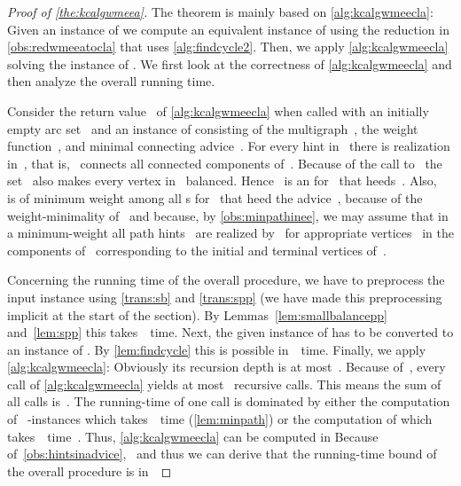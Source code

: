 \begin{proof}[Proof of \autoref{the:kcalgwmeea}]
  The theorem is mainly based on \autoref{alg:kcalgwmeecla}: Given an instance of \pWMEECAs{} we compute an equivalent instance of \pWMEECCLAs{} using the reduction in \autoref{obs:redwmeeatocla} that uses \autoref{alg:findcycle2}. Then, we apply \autoref{alg:kcalgwmeecla} solving the instance of \pWMEECLAs{}. We first look at the correctness of \autoref{alg:kcalgwmeecla} and then analyze the overall running time.

  Consider the return value~ of \autoref{alg:kcalgwmeecla} when called with an initially empty arc set~ and an instance of \pWMEECLAs{} consisting of the multigraph~, the weight function~, and minimal connecting advice~. For every hint in~ there is realization in~, that is,~ connects all connected components of~. Because of the call to~ the set~ also makes every vertex in~ balanced. Hence~ is an \EE{} for~ that heeds~. Also,~ is of minimum weight among all \EE s for~ that heed the advice~, because of the weight-minimality of~ and because, by \autoref{obs:minpathinee}, we may assume that in a minimum-weight \EE{} all path hints~ are realized by~ for appropriate vertices~ in the components of~ corresponding to the initial and terminal vertices of~.

Concerning the running time of the overall procedure, we have to preprocess the input instance using \autoref{trans:sb} and \autoref{trans:spp} (we have made this preprocessing implicit at the start of the section). By Lemmas~\ref{lem:smallbalancepp} and~\ref{lem:spp} this takes~~time. Next, the given instance of \pWMEECAs{} has to be converted to an instance of \pWMEECCLAs{}. By \autoref{lem:findcycle} this is possible in~~time. Finally, we apply \autoref{alg:kcalgwmeecla}: Obviously its recursion depth is at most~. Because of~, every call of \autoref{alg:kcalgwmeecla} yields at most~ recursive calls. This means the sum of all calls is~. The running-time of one call is dominated by either the computation of~ -instances which takes~~time (\autoref{lem:minpath}) or the computation of  which takes~~time~\cite{DMNW10}. Thus, \autoref{alg:kcalgwmeecla} can be computed in 
Because of~\autoref{obs:hintsinadvice},~ and thus we can derive that the running-time bound of the overall procedure is in~

\end{proof}

